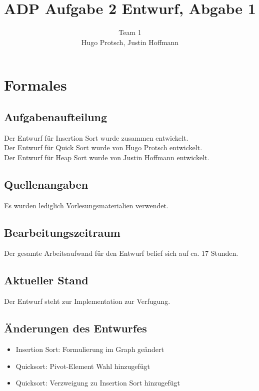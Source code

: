 \documentclass[11pt]{article}
\title{ADP Aufgabe 2 Entwurf, Abgabe 1}
\author{Team 1\\Hugo Protsch, Justin Hoffmann}
\begin{document}
    \maketitle

    \tableofcontents

    \newpage


    \section{Formales}\label{sec:Formales}


    \subsection*{Aufgabenaufteilung}
    Der Entwurf für Insertion Sort wurde zusammen entwickelt.\\
    Der Entwurf für Quick Sort wurde von Hugo Protsch entwickelt.\\
    Der Entwurf für Heap Sort wurde von Justin Hoffmann entwickelt.

    \subsection*{Quellenangaben}
    Es wurden lediglich Vorlesungsmaterialien verwendet.

    \subsection*{Bearbeitungszeitraum}
    Der gesamte Arbeitsaufwand für den Entwurf belief sich auf ca. 17 Stunden.


    \subsection*{Aktueller Stand}
    Der Entwurf steht zur Implementation zur Verfugung.

    \subsection*{Änderungen des Entwurfes}
    \begin{itemize}
        \item Insertion Sort: Formulierung im Graph geändert
        \item Quicksort: Pivot-Element Wahl hinzugefügt
        \item Quicksort: Verzweigung zu Insertion Sort hinzugefügt
    \end{itemize}
\end{document}
